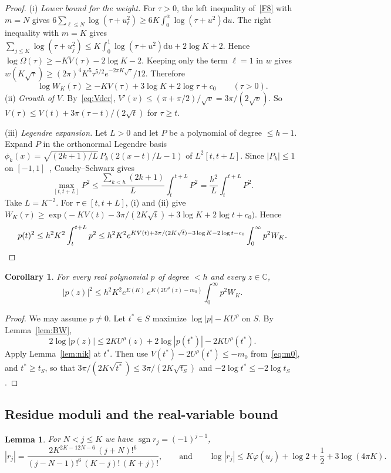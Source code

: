 \documentclass[11pt]{article}
\newtheorem{lemma}{Lemma}
\newtheorem{corollary}{Corollary}
\theoremstyle{remark}
\newcommand{\C}{\mathbb{C}}
\newcommand{\Vt}{\widetilde{V}}
\newcommand{\dd}{\mathrm{d}}
\DeclareMathOperator{\sgn}{sgn}
\begin{document}
\begin{proof}
(i) \emph{Lower bound for the weight.} For $\tau>0$, the left inequality of~\ref{F8} with $m=N$ gives $6\sum_{\ell\le N}\log(\tau+u_\ell^2)\ge6K\int_0^\alpha\log(\tau+u^2)\dd u$. The right inequality with $m=K$ gives $\sum_{j\le K}\log(\tau+u_j^2)\le K\int_0^1\log(\tau+u^2)\dd u+2\log K+2$. Hence $\log\Omega(\tau)\ge-K\Vt(\tau)-2\log K-2$. Keeping only the term $\ell=1$ in $w$ gives $w(K\sqrt\tau)\ge(2\pi)^4K^5\tau^{5/2}e^{-2\pi K\sqrt\tau}/12$. Therefore
\[
\log W_K(\tau)\ge-KV(\tau)+3\log K+2\log\tau+c_0\qquad(\tau>0).
\]
(ii) \emph{Growth of $V$.} By~\eqref{eq:Vder}, $V'(v)\le(\pi+\pi/2)/\sqrt v=3\pi/(2\sqrt v)$. So $V(\tau)\le V(t)+3\pi(\tau-t)/(2\sqrt t)$ for $\tau\ge t$.

(iii) \emph{Legendre expansion.} Let $L>0$ and let $P$ be a polynomial of degree $\le h-1$. Expand $P$ in the orthonormal Legendre basis $\phi_k(x)=\sqrt{(2k+1)/L}\,P_k(2(x-t)/L-1)$ of $L^2[t,t+L]$. Since $|P_k|\le1$ on $[-1,1]$~\cite[18.14.1]{DLMF}, Cauchy--Schwarz gives
\[
\max_{[t,t+L]}P^2\le\frac{\sum_{k<h}(2k+1)}{L}\int_t^{t+L}P^2=\frac{h^2}L\int_t^{t+L}P^2 .
\]
Take $L=K^{-2}$. For $\tau\in[t,t+L]$, (i) and (ii) give $W_K(\tau)\ge\exp\bigl(-KV(t)-3\pi/(2K\sqrt t)+3\log K+2\log t+c_0\bigr)$. Hence
\[
p(t)^2\le h^2K^2\int_t^{t+L}p^2\le h^2K^2e^{KV(t)+3\pi/(2K\sqrt t)-3\log K-2\log t-c_0}\int_0^\infty p^2W_K.\qedhere
\]
\end{proof}

\begin{corollary}\label{cor:BWN}
For every real polynomial $p$ of degree $<h$ and every $z\in\C$,
\[
|p(z)|^2\le h^2K^2e^{E(K)}\,e^{K(2U^\rho(z)-m_0)}\int_0^\infty p^2W_K .
\]
\end{corollary}

\begin{proof}
We may assume $p\ne0$. Let $t^*\in S$ maximize $\log|p|-KU^\rho$ on $S$. By Lemma~\ref{lem:BW},
\[
2\log|p(z)|\le2KU^\rho(z)+2\log|p(t^*)|-2KU^\rho(t^*).
\]
Apply Lemma~\ref{lem:nik} at $t^*$. Then use $V(t^*)-2U^\rho(t^*)\le-m_0$ from~\eqref{eq:m0}, and $t^*\ge t_S$, so that $3\pi/(2K\sqrt{t^*})\le3\pi/(2K\sqrt{t_S})$ and $-2\log t^*\le-2\log t_S$.
\end{proof}

\subsection{Residue moduli and the real-variable bound}

\begin{lemma}\label{lem:resid}
For $N<j\le K$ we have $\sgn r_j=(-1)^{j-1}$,
\[
|r_j|=\frac{2K^{2K-12N-6}\,(j+N)!^6}{(j-N-1)!^6\,(K-j)!\,(K+j)!},
\qquad\text{and}\qquad
\log|r_j|\le K\varphi(u_j)+\log2+\frac12+3\log(4\pi K).
\]
\end{lemma}
\end{document}
